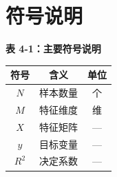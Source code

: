 \section{符号说明}

\begin{center}
  {\fontsize{10.5pt}{12.6pt}\heiti\bfseries 表 4-1：主要符号说明}\\[0.6em]
  \begin{tabular}{ccc}
    \toprule
    \textbf{符号} & \textbf{含义} & \textbf{单位} \\
    \midrule
    $N$   & 样本数量 & 个 \\
    $M$   & 特征维度 & 维 \\
    $X$   & 特征矩阵 & --- \\
    $y$   & 目标变量 & --- \\
    $R^2$ & 决定系数 & --- \\
    \bottomrule
  \end{tabular}
\end{center}
